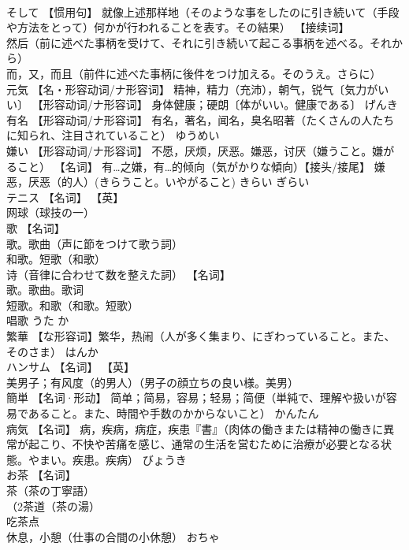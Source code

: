 \documentclass[8pt]{extreport}
\begin{document}
\begin{CJK}{UTF8}{min}
\\	そして	【惯用句】 就像上述那样地（そのような事をしたのに引き続いて（手段や方法をとって）何かが行われることを表す。その結果） 【接续词】 
\\	然后（前に述べた事柄を受けて、それに引き続いて起こる事柄を述べる。それから） 
\\	而，又，而且（前件に述べた事柄に後件をつけ加える。そのうえ。さらに）		
\\	元気	【名・形容动词/ナ形容词】 精神，精力（充沛），朝气，锐气〔気力がいい〕 【形容动词/ナ形容词】 身体健康；硬朗〔体がいい。健康である〕	げんき	
\\	有名	【形容动词/ナ形容词】 有名，著名，闻名，臭名昭著（たくさんの人たちに知られ、注目されていること）	ゆうめい	
\\	嫌い	【形容动词/ナ形容词】 不愿，厌烦，厌恶。嫌恶，讨厌（嫌うこと。嫌がること） 【名词】 有…之嫌，有…的倾向（気がかりな傾向）【接头/接尾】 嫌恶，厌恶（的人）(きらうこと。いやがること)	きらい ぎらい	
\\	テニス	【名词】 【英】
\\	网球（球技の一）		
\\	歌	【名词】 
\\	歌。歌曲（声に節をつけて歌う詞） 
\\	和歌。短歌（和歌） 
\\	诗（音律に合わせて数を整えた詞） 【名词】 
\\	歌。歌曲。歌词 
\\	短歌。和歌（和歌。短歌） 
\\	唱歌	うた か	
\\	繁華	【な形容词】繁华，热闹（人が多く集まり、にぎわっていること。また、そのさま）	はんか	
\\	ハンサム	【名词】 【英】
\\	美男子；有风度（的男人）（男子の顔立ちの良い様。美男）		
\\	簡単	【名词·形动】 简单；简易，容易；轻易；简便（単純で、理解や扱いが容易であること。また、時間や手数のかからないこと）	かんたん	
\\	病気	【名词】 病，疾病，病症，疾患『書』（肉体の働きまたは精神の働きに異常が起こり、不快や苦痛を感じ、通常の生活を営むために治療が必要となる状態。やまい。疾患。疾病）	びょうき	
\\	お茶	【名词】 
\\	茶（茶の丁寧語） 
\\	（2茶道（茶の湯） 
\\	吃茶点 
\\	休息，小憩（仕事の合間の小休憩）	おちゃ	

\end{CJK}
\end{document}
